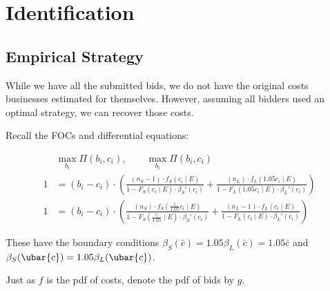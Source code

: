 \section{Identification}

\setlength{\parindent}{0cm}

\subsection{Empirical Strategy}

While we have all the submitted bids, we do not have the original costs
businesses estimated for themselves. However, assuming all bidders used
an optimal strategy, we can recover those costs.

Recall the FOCs and differential equations:

\[
  \begin{aligned}
  & \max_{b_i} \Pi(b_i, c_i), \qquad \max_{b_i} \Pi(b_i, c_i) \\
  1 &= (b_i - c_i) \cdot \left(
    \frac{(n_S - 1) \cdot f_S(c_i \mid E)}{1 - F_S(c_i \mid E) \cdot \beta_S'(c_i)} +
    \frac{(n_L) \cdot f_L(1.05 c_i \mid E)}{1 - F_L(1.05 c_i \mid E) \cdot \beta_L'(c_i)} \right) \\
  1 &= (b_i - c_i) \cdot \left(
    \frac{(n_S) \cdot f_S(\frac{1}{1.05} c_i \mid E)}{1 - F_S(\frac{c_i}{1.05} \mid E) \cdot \beta_S'(c_i)} +
    \frac{(n_L - 1) \cdot f_L(c_i \mid E)}{1 - F_L(c_i \mid E) \cdot \beta_L'(c_i)} \right)
  \end{aligned}
\]

These have the boundary conditions \( \beta_S(\bar{c}) = 1.05 \beta_L(\bar{c}) = 1.05\bar{c}\)
and \(\beta_S(\ubar{c}) = 1.05\beta_L(\ubar{c})\).

Just as \(f\) is the pdf of costs, denote the pdf of bids by \(g\).

\vspace{0.2cm}

